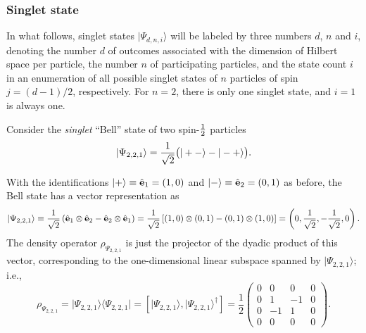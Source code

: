 \documentclass[pra,amsfonts,showpacs,showkeys,preprint]{revtex4}
\begin{document}
\subsubsection*{Singlet state}




In what follows, singlet states $\vert \Psi_{d,n,i} \rangle$ will be labeled by three numbers $d$, $n$ and $i$,
denoting
the number $d$ of outcomes associated with the dimension of Hilbert space per particle,
the number $n$ of participating particles,
and the state count $i$ in an enumeration of all possible singlet states of $n$ particles of spin $j=(d-1)/2$, respectively.
For $n=2$, there is only one singlet state, and $i=1$ is always one.

Consider the {\em singlet} ``Bell'' state of two spin-${1\over 2}$
particles
\begin{equation}
\vert \Psi_{2,2,1} \rangle
=
 {1\over \sqrt{2}}
\bigl(
\vert +- \rangle -
\vert -+ \rangle
\bigr)
.
\label{2009-gtq-s1s21}
\end{equation}

With the identifications
$
\vert +\rangle
\equiv {\hat {\bf e}}_1 =(1,0)
$
and
$
\vert -\rangle \equiv {\hat {\bf e}}_2 =(0,1)
$ as before,
the Bell state has a vector representation as
\begin{equation}
\vert  \Psi_{2,2,1}\rangle
 \equiv
{1\over \sqrt{2}}\left({\hat {\bf e}}_1\otimes {\hat {\bf e}}_2-{\hat {\bf e}}_2\otimes {\hat {\bf e}}_1 \right)
= {1\over \sqrt{2}}\left[ (1,0)\otimes (0,1) - (0,1) \otimes (1,0)\right]
=\left( 0,\frac{1}{\sqrt{2}},- \frac{1}{\sqrt{2}} ,  0 \right).
\label{2005-hp-ep12s1v}
\end{equation}
The density operator $\rho_{\Psi_{2,2,1}}$
is just the projector of the dyadic product of this vector, corresponding to the one-dimensional
linear subspace spanned by  $\vert  \Psi_{2,2,1}\rangle $; i.e.,
\begin{equation}
\rho_{\Psi_{2,2,1}} = \vert  \Psi_{2,2,1}\rangle \langle  \Psi_{2,2,1} \vert
=
\left[ \vert  \Psi_{2,2,1}\rangle ,\vert  \Psi_{2,2,1}\rangle^\dagger \right]
=
\frac{1}{2}
 \left(
\begin{array}{rrrr}
0&0&0&0\\
0&1&-1&0\\
0&-1&1&0\\
0&0&0&0
\end{array}
\right)
.
\end{equation}
\end{document}
